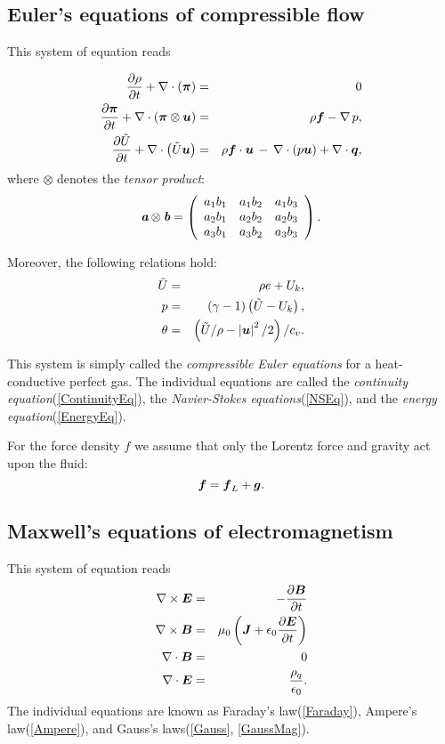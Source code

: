 \subsection{Euler's equations of compressible flow}
This system of equation reads

\begin{eqnarray}
\label{ContinuityEq} \frac{\partial{\rho}}{\partial{t}} + \nabla\cdot\left(\mbox{\boldmath $\pi$}\right) & = & 0\\
\label{NSEq} \frac{\partial{\mbox{\boldmath $\pi$}}}{\partial{t}} + \nabla\cdot\left(\mbox{\boldmath $\pi$}\otimes\mbox{\boldmath $u$}\right)& = & \rho\mbox{\boldmath $f$} - \nabla\,p,\\
\label{EnergyEq} \frac{\partial{\tilde{U}}}{\partial{t}} + \nabla\cdot\left({\tilde{U}}\mbox{\boldmath $u$}\right) & = & \rho\mbox{\boldmath $f$}\cdot\mbox{\boldmath $u$} \,-\,\nabla\cdot\left({p}\mbox{\boldmath $u$}\right) + \nabla\cdot\mbox{\boldmath $q$},
\end{eqnarray}
where $\otimes$ denotes the \textit{tensor product}:
\begin{displaymath}
\textit{\textbf{a}}\otimes\textit{\textbf{b}} =
\left(
\begin{array}{ccc}
a_1b_1 & a_1b_2 & a_1b_3 \\
a_2b_1 & a_2b_2 & a_2b_3 \\
a_3b_1 & a_3b_2 & a_3b_3
\end{array}
\right).
\end{displaymath}

Moreover, the following relations hold:
\begin{eqnarray}
\tilde{U} & = & \rho e + U_k,\\
p & = & \left({}\gamma-1\right)\left({\tilde{U}}-U_k\right), \label{therm_1}\\
\theta & = & \left({\tilde{U}}/{\rho}-\left|\mbox{\boldmath $u$}\right|^2/2\right)/{c_v}.
\end{eqnarray}

This system is simply called the \textit{compressible Euler equations} for a heat-conductive perfect gas. The individual equations are called the \textit{continuity equation}(\ref{ContinuityEq}), the \textit{Navier-Stokes equations}(\ref{NSEq}), and the \textit{energy equation}(\ref{EnergyEq}).

For the force density $f$ we assume that only the Lorentz force and gravity act upon the fluid:
$$
\label{ForceEq} \mbox{\boldmath $f$} = \mbox{\boldmath $f$}_L + \mbox{\boldmath $g$}.
$$


\subsection{Maxwell's equations of electromagnetism}
This system of equation reads
\begin{eqnarray}
\label{Faraday} \nabla \times \mbox{\boldmath $E$} & = & -\frac{\partial{\mbox{\boldmath $B$}}}{\partial{t}}\\
\label{Ampere} \nabla \times \mbox{\boldmath $B$} & = & \mu_0 \left( \mbox{\boldmath $J$} + \epsilon_0 \frac{\partial{\mbox{\boldmath $E$}}}{\partial{t}}\right)\\\
\label{GaussMag} \nabla \cdot \mbox{\boldmath $B$} & = &0\\
\label{Gauss} \nabla \cdot \mbox{\boldmath $E$} & = & \frac{\rho_q}{\epsilon_0}.
\end{eqnarray}
The individual equations are known as Faraday's law(\ref{Faraday}), Ampere's law(\ref{Ampere}), and Gauss's laws(\ref{Gauss}, \ref{GaussMag}).


